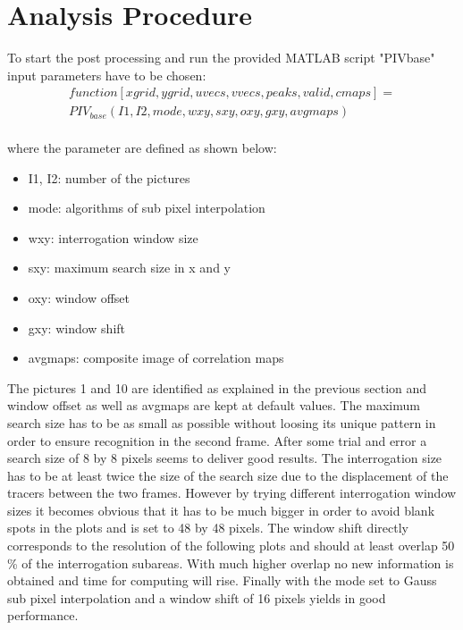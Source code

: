 \chapter{Analysis Procedure}\label{sec:methodofattack}
To start the post processing and run the provided MATLAB script "PIVbase" input parameters have to be chosen:
\begin{equation}
\begin{split}
function [xgrid,ygrid,uvecs,vvecs,peaks,valid,cmaps] = \\
PIV_{base} (I1,I2,mode,wxy,sxy,oxy,gxy,avgmaps)
\end{split}
\end{equation}\\
where the parameter are defined as shown below:
\begin{itemize}
\item I1, I2: number of the pictures 
\item mode: algorithms of sub pixel interpolation
\item wxy: interrogation window size
\item sxy: maximum search size in x and y
\item oxy: window offset
\item gxy: window shift
\item avgmaps: composite image of correlation maps\\
\end{itemize}
The pictures 1 and 10 are identified as explained in the previous section and window offset as well as avgmaps are kept at default values. The maximum search size has to be as small as possible without loosing its unique pattern in order to ensure recognition in the second frame. After some trial and error a search size of 8 by 8 pixels seems to deliver good results. The interrogation size has to be at least twice the size of the search size due to the displacement of the tracers between the two frames. However by trying different interrogation window sizes it becomes obvious that it has to be much bigger in order to avoid blank  spots in the plots and is set to 48 by 48 pixels. The window shift directly corresponds to the resolution of the following plots and should at least  overlap 50 \% of the interrogation subareas. With much higher overlap no new information is obtained and time for computing will rise. Finally with the mode set to Gauss sub pixel interpolation and a window shift of 16 pixels yields in good performance.\\

